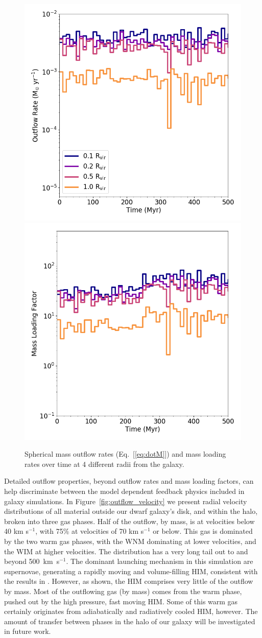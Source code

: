 \documentclass[twocolumn]{aastex61}
\begin{document}
\begin{figure}
\centering
\includegraphics[width=0.45\linewidth]{total_mass_outflow}
\includegraphics[width=0.45\linewidth]{total_mass_loading}
\caption{Spherical mass outflow rates (Eq.~[\ref{eq:dotM}]) and mass loading rates over time at 4 different radii from the galaxy.}
\label{fig:mass_outflow}
\end{figure}

Detailed outflow properties, beyond outflow rates and mass loading factors, can help discriminate between the model dependent feedback physics included in galaxy simulations. In Figure~\ref{fig:outflow_velocity} we present radial velocity distributions of all material outside our dwarf galaxy's disk, and within the halo, broken into three gas phases. Half of the outflow, by mass, is at velocities below 40 km s$^{-1}$, with 75\% at velocities of 70 km s$^{-1}$ or below. This gas is dominated by the two warm gas phases, with the WNM dominating at lower velocities, and the WIM at higher velocities. The distribution has a very long tail out to and beyond 500~km~s$^{-1}$. The dominant launching mechanism in this simulation are supernovae, generating a rapidly moving and volume-filling HIM, consistent with the results in \citet{Hu2016,Hu2017}. However, as shown, the HIM comprises very little of the outflow by mass. Most of the outflowing gas (by mass) comes from the warm phase, pushed out by the high pressure, fast moving HIM. Some of this warm gas certainly originates from adiabatically and radiatively cooled HIM, however. The amount of transfer between phases in the halo of our galaxy will be investigated in future work.
\end{document}
